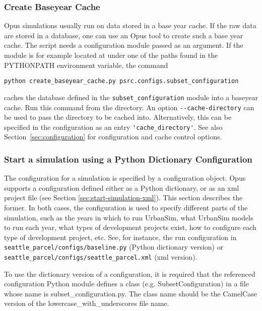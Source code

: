 \subsubsection{Create Baseyear Cache}
\label{sec:run-manager-baseyearcache}
%
Opus simulations usually run on data stored in a base year cache.
If the raw data are stored in a database, 
one can use an Opus tool to create such a base year cache.
The script needs a configuration module passed as an argument. 
If the module is for example located at
 under one of the paths found in the
PYTHONPATH environment variable, the command
\begin{verbatim}
python create_baseyear_cache.py psrc.configs.subset_configuration
\end{verbatim}
caches the database defined in the \verb|subset_configuration| module into a baseyear
cache.  Run this command from 
the  directory. An option \verb|--cache-directory|
can be used to pass the directory to be cached into. Alternatively, this can be
specified in the configuration as an entry \verb|'cache_directory'|. See also
Section~\ref{sec:configuration} for configuration and cache control options.

\subsubsection{Start a simulation using a Python Dictionary Configuration}

The configuration for a simulation is specified by a configuration object.
Opus supports a configuration defined either as a Python dictionary, or as an xml project file
(see Section \ref{sec:start-simulation-xml}). This section describes the former.
In both cases, the configuration is used to specify different parts
of the simulation, such as the years in which to run UrbanSim, what
UrbanSim models to run each year, what types of development
projects exist, how to configure each type of development project,
etc. See, for instance, the run configuration in
\verb|seattle_parcel/configs/baseline.py| (Python dictionary version) or
\verb|seattle_parcel/configs/seattle_parcel.xml| (xml version).

To use the dictionary version of a configuration, it is required
that the referenced configuration Python module defines
a class (e.g. SubsetConfiguration) in a file whose name is
subset_configuration.py. The class name should be the
CamelCase version of the lowercase_with_underscores file name.

